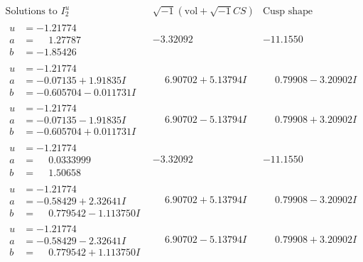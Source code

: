 \documentclass[1p]{elsarticle_modified}
\theoremstyle{definition}
\newcommand{\I}{\sqrt{-1}}
\begin{document}
$$\begin{array}{c|c|c}  
\text{Solutions to }I^u_{2}& \I (\text{vol} + \sqrt{-1}CS) & \text{Cusp shape}\\
 \hline 
\begin{aligned}
u &= -1.21774\phantom{ +0.000000I} \\
a &= \phantom{-}1.27787\phantom{ +0.000000I} \\
b &= -1.85426\phantom{ +0.000000I}\end{aligned}
 & -3.32092\phantom{ +0.000000I} & -11.1550\phantom{ +0.000000I} \\ \hline\begin{aligned}
u &= -1.21774\phantom{ +0.000000I} \\
a &= -0.07135 + 1.91835 I \\
b &= -0.605704 - 0.011731 I\end{aligned}
 & \phantom{-}6.90702 + 5.13794 I & \phantom{-}0.79908 - 3.20902 I \\ \hline\begin{aligned}
u &= -1.21774\phantom{ +0.000000I} \\
a &= -0.07135 - 1.91835 I \\
b &= -0.605704 + 0.011731 I\end{aligned}
 & \phantom{-}6.90702 - 5.13794 I & \phantom{-}0.79908 + 3.20902 I \\ \hline\begin{aligned}
u &= -1.21774\phantom{ +0.000000I} \\
a &= \phantom{-}0.0333999\phantom{ +0.000000I} \\
b &= \phantom{-}1.50658\phantom{ +0.000000I}\end{aligned}
 & -3.32092\phantom{ +0.000000I} & -11.1550\phantom{ +0.000000I} \\ \hline\begin{aligned}
u &= -1.21774\phantom{ +0.000000I} \\
a &= -0.58429 + 2.32641 I \\
b &= \phantom{-}0.779542 - 1.113750 I\end{aligned}
 & \phantom{-}6.90702 + 5.13794 I & \phantom{-}0.79908 - 3.20902 I \\ \hline\begin{aligned}
u &= -1.21774\phantom{ +0.000000I} \\
a &= -0.58429 - 2.32641 I \\
b &= \phantom{-}0.779542 + 1.113750 I\end{aligned}
 & \phantom{-}6.90702 - 5.13794 I & \phantom{-}0.79908 + 3.20902 I \\ \hline\begin{aligned}

\end{aligned}
\end{array}$$
\end{document}
